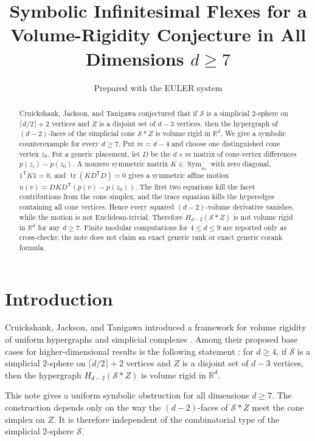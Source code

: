 \documentclass[11pt]{article}
\title{Symbolic Infinitesimal Flexes for a Volume-Rigidity Conjecture in All Dimensions \(d\geq 7\)}
\author{Prepared with the EULER system}
\date{}
\theoremstyle{definition}
\newcommand{\R}{\mathbb{R}}
\newcommand{\cS}{\mathcal{S}}
\newcommand{\tr}{\operatorname{tr}}
\newcommand{\Sym}{\operatorname{Sym}}
\begin{document}
\maketitle

\begin{abstract}
Cruickshank, Jackson, and Tanigawa conjectured that if \(\cS\) is a
simplicial \(2\)-sphere on \(\lceil d/2\rceil+2\) vertices and \(Z\)
is a disjoint set of \(d-3\) vertices, then the hypergraph of
\((d-2)\)-faces of the simplicial cone \(\cS*Z\) is volume rigid in
\(\R^d\).  We give a symbolic counterexample for every \(d\geq 7\).
Put \(m=d-4\) and choose one distinguished cone vertex \(z_0\).  For a
generic placement, let \(D\) be the \(d\times m\) matrix of cone-vertex
differences \(p(z_i)-p(z_0)\).  A nonzero symmetric matrix
\(K\in\Sym_m\) with zero diagonal, \(1^{\mathsf T}K1=0\), and
\(\tr(KD^{\mathsf T}D)=0\) gives a symmetric affine motion
\(u(v)=DKD^{\mathsf T}(p(v)-p(z_0))\).  The first two equations kill
the facet contributions from the cone simplex, and the trace equation
kills the hyperedges containing all cone vertices.  Hence every
squared \((d-2)\)-volume derivative vanishes, while the motion is not
Euclidean-trivial.  Therefore \(H_{d-2}(\cS*Z)\) is not volume rigid in
\(\R^d\) for any \(d\geq 7\).  Finite modular computations for
\(4\leq d\leq 9\) are reported only as cross-checks; the note does not
claim an exact generic rank or exact generic corank formula.
\end{abstract}

\section{Introduction}

Cruickshank, Jackson, and Tanigawa introduced a framework for volume
rigidity of uniform hypergraphs and simplicial complexes
\cite{CruickshankJacksonTanigawa2026}.  Among their proposed base cases
for higher-dimensional results is the following statement
\cite[Conjecture~22]{CruickshankJacksonTanigawa2026}: for \(d\geq 4\),
if \(\cS\) is a simplicial \(2\)-sphere on
\(\lceil d/2\rceil+2\) vertices and \(Z\) is a disjoint set of
\(d-3\) vertices, then the hypergraph \(H_{d-2}(\cS*Z)\) is volume
rigid in \(\R^d\).

This note gives a uniform symbolic obstruction for all dimensions
\(d\geq 7\).  The construction depends only on the way the
\((d-2)\)-faces of \(\cS*Z\) meet the cone simplex on \(Z\).  It is
therefore independent of the combinatorial type of the simplicial
\(2\)-sphere \(\cS\).
\end{document}
